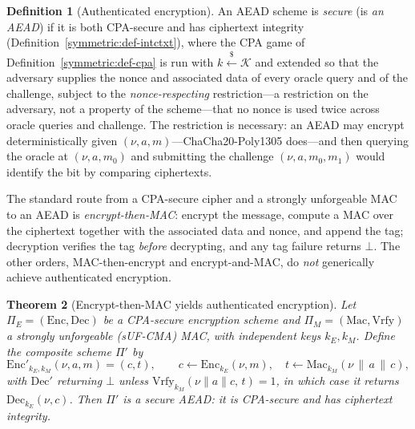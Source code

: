 \documentclass[11pt,a4paper]{article}
\newtheorem{theorem}{Theorem}[section]
\theoremstyle{definition}
\newtheorem{definition}[theorem]{Definition}
\theoremstyle{remark}
\begin{document}
\begin{definition}[Authenticated encryption]\label{symmetric:def-ae}
An AEAD scheme is \emph{secure} (is \emph{an AEAD}) if it is both
CPA-secure and has ciphertext integrity
(Definition~\ref{symmetric:def-intctxt}), where the CPA game of
Definition~\ref{symmetric:def-cpa} is run with
\(k \xleftarrow{\$} \mathcal{K}\) and extended so that the adversary
supplies the nonce and associated data of every oracle query and of
the challenge, subject to the \emph{nonce-respecting}
restriction---a restriction on the adversary, not a property of the
scheme---that no nonce is used twice across oracle queries and
challenge. The restriction is necessary: an AEAD may encrypt
deterministically given \((\nu, a, m)\)---ChaCha20-Poly1305
does---and then querying the oracle at \((\nu, a, m_{0})\) and
submitting the challenge \((\nu, a, m_{0}, m_{1})\) would identify
the bit by comparing ciphertexts.
\end{definition}

The standard route from a CPA-secure cipher and a strongly
unforgeable MAC to an AEAD is \emph{encrypt-then-MAC}: encrypt the
message, compute a MAC over the ciphertext together with the
associated data and nonce, and append the tag; decryption verifies
the tag \emph{before} decrypting, and any tag failure returns
\(\bot\). The other orders, MAC-then-encrypt and encrypt-and-MAC, do
\emph{not} generically achieve authenticated encryption.

\begin{theorem}[Encrypt-then-MAC yields authenticated encryption]
\label{symmetric:thm-etm}
Let \(\Pi_{E} = (\mathrm{Enc}, \mathrm{Dec})\) be a CPA-secure
encryption scheme and \(\Pi_{M} = (\mathrm{Mac}, \mathrm{Vrfy})\) a
strongly unforgeable (sUF-CMA) MAC, with \emph{independent} keys
\(k_{E}, k_{M}\). Define the composite scheme \(\Pi'\) by
\[
\mathrm{Enc}'_{k_{E}, k_{M}}(\nu, a, m) = (c, t),
\qquad
c \gets \mathrm{Enc}_{k_{E}}(\nu, m),
\quad
t \gets \mathrm{Mac}_{k_{M}}(\nu \,\|\, a \,\|\, c),
\]
with \(\mathrm{Dec}'\) returning \(\bot\) unless
\(\mathrm{Vrfy}_{k_{M}}(\nu \|a\| c,\, t) = 1\), in which case it
returns \(\mathrm{Dec}_{k_{E}}(\nu, c)\). Then \(\Pi'\) is a secure
AEAD: it is CPA-secure and has ciphertext integrity.
\end{theorem}
\end{document}

